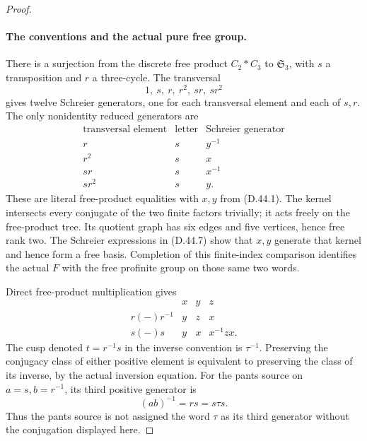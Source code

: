 \begin{proof}
\paragraph{The conventions and the actual pure free group.}
There is a surjection from the discrete free product
\(C_2*C_3\) to \(\mathfrak S_3\), with \(s\) a
transposition and \(r\) a three-cycle.
The transversal
\[
                      1,\ s,\ r,\ r^2,\ sr,\ sr^2
 \tag{D.44.6}
\]
gives twelve Schreier generators, one for each
transversal element and each of \(s,r\).
The only nonidentity reduced generators are
\[
 \begin{array}{c|c|c}
 \text{transversal element}&\text{letter}&
                          \text{Schreier generator}\\ \hline
 r&s&y^{-1}\\
 r^2&s&x\\
 sr&s&x^{-1}\\
 sr^2&s&y .
 \end{array}
 \tag{D.44.7}
\]
These are literal free-product equalities with
\(x,y\) from \textup{(D.44.1)}.
The kernel intersects every conjugate of the
two finite factors trivially; it acts freely
on the free-product tree.
Its quotient graph has six edges and five
vertices, hence free rank two.
The Schreier expressions in
\textup{(D.44.7)} show that \(x,y\) generate
that kernel and hence form a free basis.
Completion of this finite-index comparison
identifies the actual \(F\) with the free
profinite group on those same two words.

Direct free-product multiplication gives
\[
 \begin{array}{c|ccc}
       &x&y&z\\ \hline
 r(-)r^{-1}&y&z&x\\
 s(-)s&y&x&x^{-1}zx .
 \end{array}
 \tag{D.44.8}
\]
The cusp denoted \(t=r^{-1}s\) in the inverse
convention is \(\tau^{-1}\).
Preserving the conjugacy class of either
positive element is equivalent to preserving
the class of its inverse, by the actual
inversion equation.
For the pants source on \(a=s,b=r^{-1}\),
its third positive generator is
\[
             (ab)^{-1}=rs=s\tau s .
 \tag{D.44.9}
\]
Thus the pants source is not assigned the
word \(\tau\) as its third generator without
the conjugation displayed here.


\end{proof}
